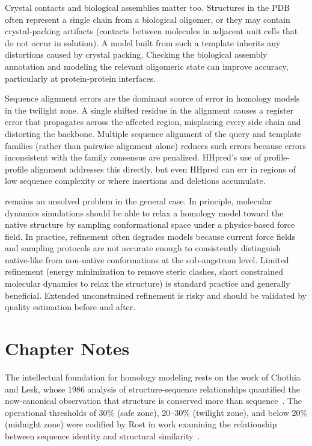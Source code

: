 Crystal contacts and biological assemblies matter too. Structures in the PDB often represent a single chain from a biological oligomer, or they may contain crystal-packing artifacts (contacts between molecules in adjacent unit cells that do not occur in solution). A model built from such a template inherits any distortions caused by crystal packing. Checking the biological assembly annotation and modeling the relevant oligomeric state can improve accuracy, particularly at protein-protein interfaces.

Sequence alignment errors are the dominant source of error in homology models in the twilight zone. A single shifted residue in the alignment causes a register error that propagates across the affected region, misplacing every side chain and distorting the backbone. Multiple sequence alignment of the query and template families (rather than pairwise alignment alone) reduces such errors because errors inconsistent with the family consensus are penalized. HHpred's use of profile-profile alignment addresses this directly, but even HHpred can err in regions of low sequence complexity or where insertions and deletions accumulate.

 remains an unsolved problem in the general case. In principle, molecular dynamics simulations should be able to relax a homology model toward the native structure by sampling conformational space under a physics-based force field. In practice, refinement often degrades models because current force fields and sampling protocols are not accurate enough to consistently distinguish native-like from non-native conformations at the sub-angstrom level. Limited refinement (energy minimization to remove steric clashes, short constrained molecular dynamics to relax the structure) is standard practice and generally beneficial. Extended unconstrained refinement is risky and should be validated by quality estimation before and after.

\section{Chapter Notes}
\label{sec:ch06-notes}

The intellectual foundation for homology modeling rests on the work of Chothia and Lesk, whose 1986 analysis of structure-sequence relationships quantified the now-canonical observation that structure is conserved more than sequence~\cite{chothia1986}. The operational thresholds of 30\% (safe zone), 20--30\% (twilight zone), and below 20\% (midnight zone) were codified by Rost in work examining the relationship between sequence identity and structural similarity~\cite{rost1999twilight}.


